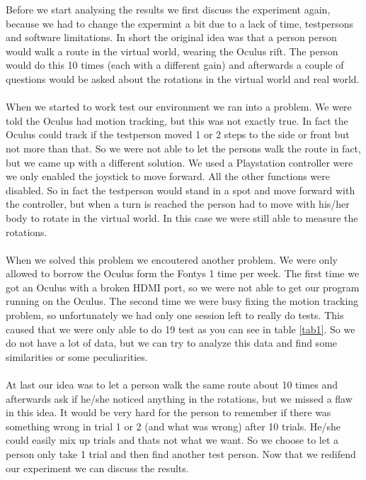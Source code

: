Before we start analysing the results we first discuss the experiment again, because we had to change the expermint a bit due to a lack of time, testpersons and software limitations. In short the original idea was that a person person would walk a route in the virtual world, wearing the Oculus rift. The person would do this 10 times (each with a different gain) and afterwards a couple of questions would be asked about the rotations in the virtual world and real world. \\
\\
When we started to work test our environment we ran into a problem. We were told the Oculus had motion tracking, but this was not exactly true. In fact the Oculus could track if the testperson moved 1 or 2 steps to the side or front but not more than that. So we were not able to let the persons walk the route in fact, but we came up with a different solution. We used a Playstation controller were we only enabled the joystick to move forward. All the other functions were disabled. So in fact the testperson would stand in a spot and move forward with the controller, but when a turn is reached the person had to move with his/her body to rotate in the virtual world. In this case we were still able to measure the rotations.\\
\\
When we solved this problem we encoutered another problem. We were only allowed to borrow the Oculus form the Fontys 1 time per week. The first time we got an Oculus with a broken HDMI port, so we were not able to get our program running on the Oculus. The second time we were busy fixing the motion tracking problem, so unfortunately we had only one session left to really do tests. This caused that we were only able to do 19 test as you can see in table \ref{tab1}. So we do not have a lot of data, but we can try to analyze this data and find some similarities or some peculiarities. \\
\\
At last our idea was to let a person walk the same route about 10 times and afterwards ask if he/she noticed anything in the rotations, but we missed a flaw in this idea. It would be very hard for the person to remember if there was something wrong in trial 1 or 2 (and what was wrong) after 10 trials. He/she could easily mix up trials and thats not what we want. So we choose to let a person only take 1 trial and then find another test person. Now that we redifend our experiment we can discuss the results. 
